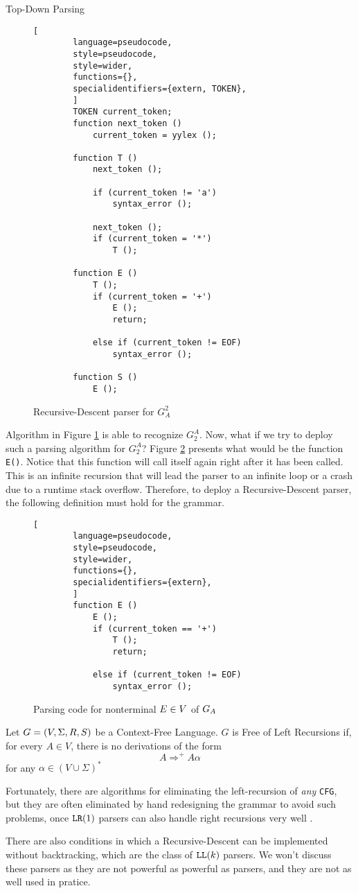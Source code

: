 \begin{section}{Top-Down Parsing}
\begin{figure}[ht]
\begin{lstlisting}[
		language=pseudocode,
		style=pseudocode,
		style=wider,
		functions={},
		specialidentifiers={extern, TOKEN},
		]
		TOKEN current_token;
		function next_token ()
			current_token = yylex ();

		function T ()
			next_token ();

			if (current_token != 'a')
				syntax_error ();

			next_token ();
			if (current_token = '*')
				T ();

		function E ()
			T ();
			if (current_token = '+')
				E ();
				return;
			
			else if (current_token != EOF)
				syntax_error ();
		
		function S ()
			E ();
	\end{lstlisting}
\caption{Recursive-Descent parser for $G_A^2$}
\label{fig:recursive-descent}
\end{figure}

Algorithm in Figure \ref{fig:recursive-descent} is able to recognize $G_2^A$.
Now, what if we try to deploy such a parsing algorithm for $G_2^A$? Figure
\ref{fig:recursive_descent_2} presents what would be the function \texttt{E()}.
Notice that this function will call itself again right after it has been
called. This is an infinite recursion that will lead the parser to an infinite
loop or a crash due to a runtime stack overflow. Therefore, to deploy a
Recursive-Descent parser, the following definition must hold for the grammar.

\begin{figure}[ht]
	\centering
	\begin{lstlisting}[
		language=pseudocode,
		style=pseudocode,
		style=wider,
		functions={},
		specialidentifiers={extern},
		]
		function E ()
			E ();
			if (current_token == '+')
				T ();
				return;
			
			else if (current_token != EOF)
				syntax_error ();
	\end{lstlisting}
\caption{Parsing code for nonterminal $\protect E \in V$ of $\protect G_A$ }
\label{fig:recursive_descent_2}
\end{figure}

\begin{definition}
	Let $G = (V, \Sigma, R, S)$ be a Context-Free Language. $G$ is Free of
	Left Recursions if, for every $A \in V$, there is no derivations
	of the form
	$$ A \Rightarrow^+ A \alpha$$
	for any $\alpha \in (V \cup \Sigma)^*$
\end{definition}

Fortunately, there are algorithms for eliminating the left-recursion of
\textit{any} \texttt{CFG}, but they are often eliminated by hand redesigning
the grammar to avoid such problems, once $\texttt{LR}(1)$ parsers can also handle
right recursions very well \citep{dragonbook}.

There are also conditions in which a Recursive-Descent can be implemented
without backtracking, which are the class of $\texttt{LL}(k)$ parsers. We
won't discuss these parsers as they are not powerful as powerful
as  parsers, and they are not as well used in pratice.

\end{section}
